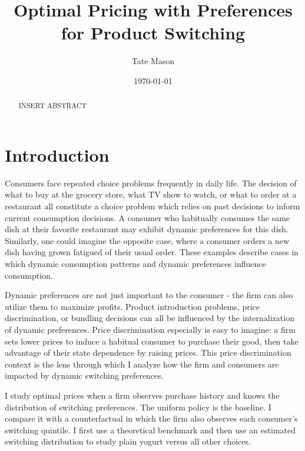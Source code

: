 \documentclass[12pt]{article}
\title{Optimal Pricing with Preferences for Product Switching}
\author{Tate Mason}
\date{\today}
\theoremstyle{definition}
\theoremstyle{remark}
\begin{document}
\maketitle

\begin{abstract}
  INSERT ABSTRACT
\end{abstract}

\newpage


\section{Introduction}
\label{sec:introduction}

Consumers face repeated choice problems frequently in daily life. The decision of what to buy at the grocery store, what TV show to watch, or what to order at a restaurant all constitute a choice problem which relies on past decisions to inform current consumption decisions. A consumer who habitually consumes the same dish at their favorite restaurant may exhibit dynamic preferences for this dish. Similarly, one could imagine the opposite case, where a consumer orders a new dish having grown fatigued of their usual order. These examples describe cases in which dynamic consumption patterns and dynamic preferences influence consumption.

Dynamic preferences are not just important to the consumer - the firm can also utilize them to maximize profits. Product introduction problems, price discrimination, or bundling decisions can all be influenced by the internalization of dynamic preferences. Price discrimination especially is easy to imagine: a firm sets lower prices to induce a habitual consumer to purchase their good, then take advantage of their state dependence by raising prices. This price discrimination context is the lens through which I analyze how the firm and consumers are impacted by dynamic switching preferences.

I study optimal prices when a firm observes purchase history and knows the
distribution of switching preferences. The uniform policy is the baseline.
I compare it with a counterfactual in which the firm also observes each
consumer's switching quintile. I first use a theoretical benchmark and then use
an estimated switching distribution to study plain yogurt versus all other
choices.
\end{document}
